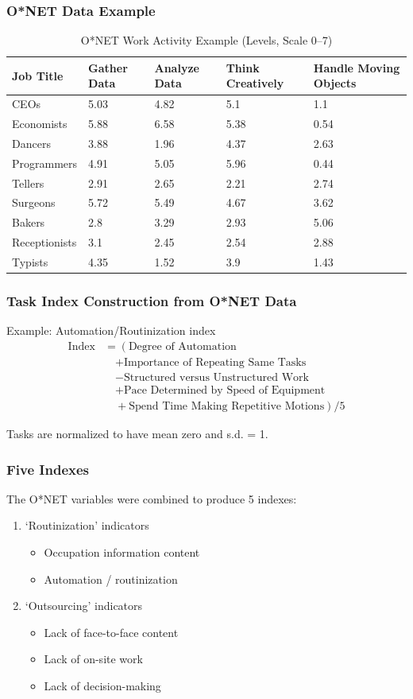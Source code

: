 \documentclass[red]{beamer}
\newcommand{\vitem}{\vfill\item}
\begin{document}
\begin{frame}
\frametitle{O*NET Data Example}
\begin{table}[htbp]
\begin{tabular}{|p{2cm}|p{1.65cm}|p{1.5cm}|p{1.5cm}|p{1.5cm}|}
\hline
{Job Title} & {Gather Data} & {Analyze Data} & {\small Think Creatively} & {Handle Moving Objects} \\ \hline
{CEOs} & 5.03 & 4.82 & 5.1 & 1.1  \\ \hline
{Economists} & 5.88 & 6.58 & 5.38 & 0.54 \\ \hline
{Dancers} & 3.88 & 1.96 & 4.37 & 2.63 \\ \hline
{Programmers} & 4.91 & 5.05 & 5.96 & 0.44 \\ \hline
{Tellers} & 2.91 & 2.65 & 2.21 & 2.74 \\ \hline
{Surgeons} & 5.72 & 5.49 & 4.67 & 3.62 \\ \hline
{Bakers} & 2.8 & 3.29 & 2.93 & 5.06 \\ \hline
{Receptionists} & 3.1 & 2.45 & 2.54 & 2.88 \\ \hline
{Typists} & 4.35 & 1.52 & 3.9 & 1.43 \\ \hline
\end{tabular}
\caption{O*NET Work Activity Example (Levels, Scale 0--7)}
\label{onetex}
\end{table}
\end{frame}

\begin{frame}[c]
\frametitle{Task Index Construction from O*NET Data}
Example: Automation/Routinization index
\begin{align*}
\text{Index} &= \left(\text{Degree of Automation}\right. \\
&\quad+ \text{Importance of Repeating Same Tasks} \\
&\quad- \text{Structured versus Unstructured Work} \\
&\quad+ \text{Pace Determined by Speed of Equipment} \\
&\quad+ \left.\text{Spend Time Making Repetitive Motions}\right) / 5
\end{align*}

Tasks are normalized to have mean zero and s.d. = 1.
\end{frame}

\begin{frame}[c]
\frametitle{Five Indexes}
The O*NET variables were combined to produce 5 indexes:
\begin{enumerate}
  \vitem `Routinization' indicators
  \begin{itemize}
    \vitem Occupation information content
    \vitem Automation / routinization
  \end{itemize}
  \vitem `Outsourcing' indicators
  \begin{itemize}
    \vitem Lack of face-to-face content
    \vitem Lack of on-site work
    \vitem Lack of decision-making
  \end{itemize}
\end{enumerate}
\end{frame}
\end{document}
